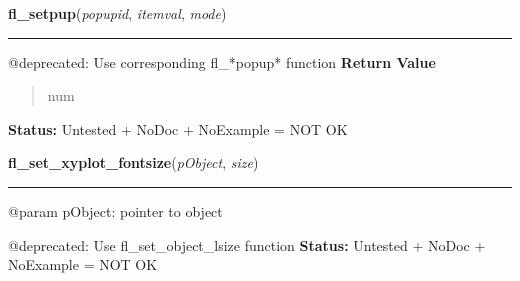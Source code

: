 \hspace{.8\funcindent}\begin{boxedminipage}{\funcwidth}

    \raggedright \textbf{fl\_setpup}(\textit{popupid}, \textit{itemval}, \textit{mode})

    \vspace{-1.5ex}

    \rule{\textwidth}{0.5\fboxrule}
\setlength{\parskip}{2ex}

@deprecated: Use corresponding fl\_*popup* function
\setlength{\parskip}{1ex}
      \textbf{Return Value}
    \vspace{-1ex}

      \begin{quote}

num
      \end{quote}

\textbf{Status:} 
Untested + NoDoc + NoExample = NOT OK


    \end{boxedminipage}

    \label{xformslib:deprecated:fl_set_xyplot_fontsize}

    \vspace{0.5ex}

\hspace{.8\funcindent}\begin{boxedminipage}{\funcwidth}

    \raggedright \textbf{fl\_set\_xyplot\_fontsize}(\textit{pObject}, \textit{size})

    \vspace{-1.5ex}

    \rule{\textwidth}{0.5\fboxrule}
\setlength{\parskip}{2ex}

@param pObject: pointer to object

@deprecated: Use fl\_set\_object\_lsize function
\setlength{\parskip}{1ex}
\textbf{Status:} 
Untested + NoDoc + NoExample = NOT OK


    \end{boxedminipage}

    \label{xformslib:deprecated:fl_set_xyplot_fontstyle}

    \vspace{0.5ex}

